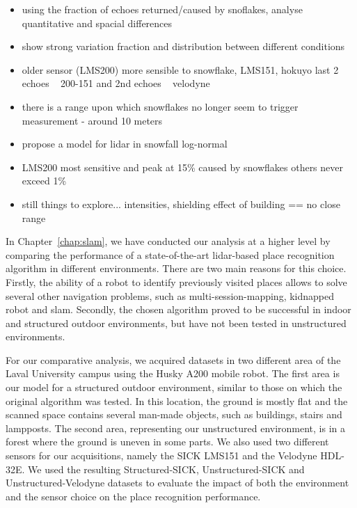 \begin{itemize}
    \item using the fraction of echoes returned/caused by snoflakes, analyse quantitative and spacial differences
    \item show strong variation fraction and distribution between different conditions
    \item older sensor (LMS200) more sensible to snowflake, LMS151, hokuyo last 2 echoes ~ 200-151 and 2nd echoes ~ velodyne
    \item there is a range upon which snowflakes no longer seem to trigger measurement -  around 10 meters
    \item propose a model for lidar in snowfall log-normal
    \item LMS200 most sensitive and peak at 15\% caused by snowflakes others never exceed 1\%
    \item still things to explore... intensities, shielding effect of building == no close range
\end{itemize}

In Chapter~\ref{chap:slam}, we have conducted our analysis at a higher level by comparing the performance of a state-of-the-art \gls*{lidar}-based place recognition algorithm in different environments. There are two main reasons for this choice. Firstly, the ability of a robot to identify previously visited places allows to solve several other navigation problems, such as multi-session-mapping, kidnapped robot and \gls*{slam}. Secondly, the chosen algorithm proved to be successful in indoor and structured outdoor environments, but have not been tested in unstructured environments.

For our comparative analysis, we acquired datasets in two different area of the Laval University campus using the Husky A200 mobile robot. The first area is our model for a structured outdoor environment, similar to those on which the original algorithm was tested. In this location, the ground is mostly flat and the scanned space contains several man-made objects, such as buildings, stairs and lampposts. The second area, representing our unstructured environment, is in a forest where the ground is uneven in some parts. We also used two different sensors for our acquisitions, namely the SICK LMS151 and the Velodyne HDL-32E. We used the resulting Structured-SICK, Unstructured-SICK and Unstructured-Velodyne datasets to evaluate the impact of both the environment and the sensor choice on the place recognition performance.

